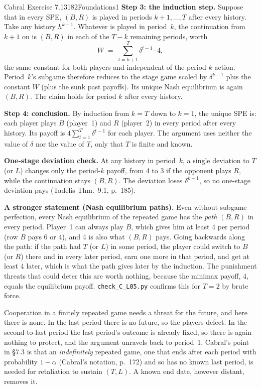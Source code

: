 \begin{exsol}{Cabral Exercise 7.13}{182}{Foundations}{1}
\textbf{Step 3: the induction step.} Suppose that in every SPE, $(B,R)$ is played in periods
$k+1, \dots, T$ after every history. Take any history $h^{k-1}$. Whatever is played in period~$k$,
the continuation from $k+1$ on is $(B,R)$ in each of the $T - k$ remaining periods, worth
\[
  W \;=\; \sum_{t=k+1}^{T} \delta^{t-1} \cdot 4 ,
\]
the same constant for both players and independent of the period-$k$ action. Period~$k$'s subgame
therefore reduces to the stage game scaled by $\delta^{k-1}$ plus the constant $W$ (plus the sunk
past payoffs). Its unique Nash equilibrium is again $(B,R)$. The claim holds for period $k$ after
every history.

\textbf{Step 4: conclusion.} By induction from $k = T$ down to $k = 1$, the unique SPE is: each
player plays $B$ (player~1) and $R$ (player~2) in every period after every history. Its payoff is
$4\sum_{t=1}^{T}\delta^{t-1}$ for each player. The argument uses neither the value of $\delta$ nor
the value of $T$, only that $T$ is finite and known.

\textbf{One-stage deviation check.} At any history in period~$k$, a single deviation to $T$ (or
$L$) changes only the period-$k$ payoff, from 4 to 3 if the opponent plays $R$, while the
continuation stays $(B,R)$. The deviation loses $\delta^{k-1}$, so no one-stage deviation pays
(Tadelis Thm.~9.1, p.~185).

\textbf{A stronger statement (Nash equilibrium paths).} Even without subgame perfection, every
Nash equilibrium of the repeated game has the \emph{path} $(B,R)$ in every period. Player~1 can
always play $B$, which gives him at least $4$ per period (row $B$ pays 6 or 4), and $4$ is also
what $(B,R)$ pays. Going backwards along the path: if the path had $T$ (or $L$) in some period, the
player could switch to $B$ (or $R$) there and in every later period, earn one more in that period,
and get at least 4 later, which is what the path gives later by the induction. The punishment
threats that could deter this are worth nothing, because the minimax payoff, 4, equals the
equilibrium payoff. \texttt{check\_C\_L05.py} confirms this for $T=2$ by brute force.

\interp Cooperation in a finitely repeated game needs a threat for the future, and here there is
none. In the last period there is no future, so the players defect. In the second-to-last period
the last period's outcome is already fixed, so there is again nothing to protect, and the argument
unravels back to period~1. Cabral's point in \S7.3 is that an \emph{indefinitely} repeated game,
one that ends after each period with probability $1-\alpha$ (Cabral's notation, p.~172) and so has no known last period, is needed for
retaliation to sustain $(T,L)$. A known end date, however distant, removes it.


\end{exsol}
